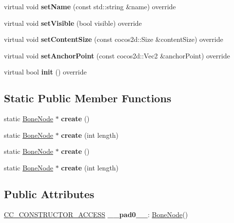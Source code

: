 \begin{DoxyCompactItemize}
virtual void {\bfseries set\+Name} (const std\+::string \&name) override
\item 
\mbox{\label{classBoneNode_ab3a97aa82f830a437d1c7923d467d7d7}} 
virtual void {\bfseries set\+Visible} (bool visible) override
\item 
\mbox{\label{classBoneNode_adfb7320fb7911ef14c887e114c957611}} 
virtual void {\bfseries set\+Content\+Size} (const cocos2d\+::\+Size \&content\+Size) override
\item 
\mbox{\label{classBoneNode_a9c2ae347667f5384525bd46cb6df176f}} 
virtual void {\bfseries set\+Anchor\+Point} (const cocos2d\+::\+Vec2 \&anchor\+Point) override
\item 
\mbox{\label{classBoneNode_ac30de68ae48f47a788be511c56b9f0df}} 
virtual bool {\bfseries init} () override
\end{DoxyCompactItemize}
\subsection*{Static Public Member Functions}
\begin{DoxyCompactItemize}
\item 
\mbox{\label{classBoneNode_ac56044de9d3b1009c13d6e7cb1f7e109}} 
static \hyperlink{classBoneNode}{Bone\+Node} $\ast$ {\bfseries create} ()
\item 
\mbox{\label{classBoneNode_a89148f9bf33bc55a1a5ab2e9b6580efc}} 
static \hyperlink{classBoneNode}{Bone\+Node} $\ast$ {\bfseries create} (int length)
\item 
\mbox{\label{classBoneNode_a9936a6b5f56d850ca9e9635bc4bcab01}} 
static \hyperlink{classBoneNode}{Bone\+Node} $\ast$ {\bfseries create} ()
\item 
\mbox{\label{classBoneNode_a23c832a6ce978e7eba6d19b2e9de65ef}} 
static \hyperlink{classBoneNode}{Bone\+Node} $\ast$ {\bfseries create} (int length)
\end{DoxyCompactItemize}
\subsection*{Public Attributes}
\begin{DoxyCompactItemize}
\item 
\mbox{\label{classBoneNode_a4f9e8f0614a605bbb54f3934a4047a33}} 
\hyperlink{_2cocos2d_2cocos_2base_2ccConfig_8h_a25ef1314f97c35a2ed3d029b0ead6da0}{C\+C\+\_\+\+C\+O\+N\+S\+T\+R\+U\+C\+T\+O\+R\+\_\+\+A\+C\+C\+E\+SS} {\bfseries \+\_\+\+\_\+pad0\+\_\+\+\_\+}\+: \hyperlink{classBoneNode}{Bone\+Node}()
\end{DoxyCompactItemize}
